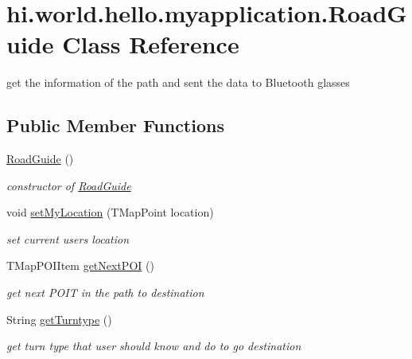\hypertarget{classhi_1_1world_1_1hello_1_1myapplication_1_1_road_guide}{}\section{hi.\+world.\+hello.\+myapplication.\+Road\+Guide Class Reference}
\label{classhi_1_1world_1_1hello_1_1myapplication_1_1_road_guide}


get the information of the path and sent the data to Bluetooth glasses  


\subsection*{Public Member Functions}
\begin{DoxyCompactItemize}
\item 
\mbox{\hyperlink{classhi_1_1world_1_1hello_1_1myapplication_1_1_road_guide_a26bab1e856c7986a35531692d9d84f4e}{Road\+Guide}} ()
\begin{DoxyCompactList}\small\item\em constructor of \mbox{\hyperlink{classhi_1_1world_1_1hello_1_1myapplication_1_1_road_guide}{Road\+Guide}} \end{DoxyCompactList}\item 
void \mbox{\hyperlink{classhi_1_1world_1_1hello_1_1myapplication_1_1_road_guide_abaddcd57733c5c7633a8b2e3e47629f8}{set\+My\+Location}} (T\+Map\+Point location)
\begin{DoxyCompactList}\small\item\em set current user\textquotesingle{}s location \end{DoxyCompactList}\item 
T\+Map\+P\+O\+I\+Item \mbox{\hyperlink{classhi_1_1world_1_1hello_1_1myapplication_1_1_road_guide_a7a914dc7c0657710e464f22d6423bb71}{get\+Next\+P\+OI}} ()
\begin{DoxyCompactList}\small\item\em get next P\+O\+IT in the path to destination \end{DoxyCompactList}\item 
String \mbox{\hyperlink{classhi_1_1world_1_1hello_1_1myapplication_1_1_road_guide_a00e2b29e78e42d25e66d2858c4165cd1}{get\+Turntype}} ()
\begin{DoxyCompactList}\small\item\em get turn type that user should know and do to go destination \end{DoxyCompactList}\item 

\end{DoxyCompactItemize}
